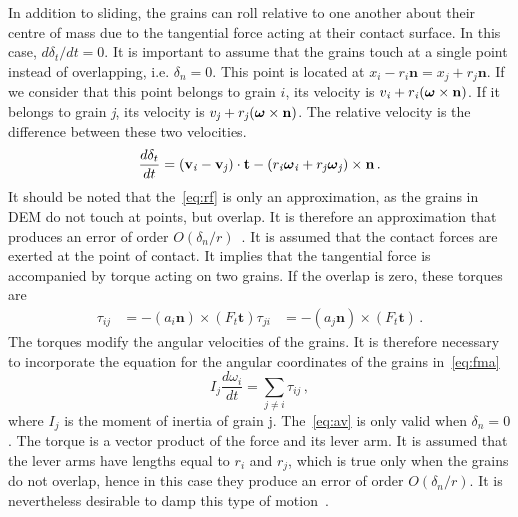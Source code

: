 In addition to sliding, the grains can roll relative to one another about their 
centre of mass due to the tangential force acting at their contact surface. In 
this case, $d\delta_{t}/dt=0$. It is important to assume that the grains touch 
at a single point instead of overlapping, i.e. $\delta_{n}=0$. This point is 
located at 
${x}_{\mathit{i}}-r_{\mathit{i}}\mathbf{n}={x}_{\mathit{j}}+r_{\mathit{j}}\mathbf{n}$.
 If we consider that this point belongs to grain $\mathit{i}$, its velocity is 
${v}_{\mathit{i}}+r_{\mathit{i}}(\mbox{\boldmath${\omega}$}\times\mathbf{n})$. 
If it belongs to grain \textit{j}, its velocity is 
${v}_{\mathit{j}}+r_{\mathit{j}}(\mbox{\boldmath${\omega}$}\times\mathbf{n})$. 
The relative velocity is the difference between these two velocities. 
%
\begin{equation}
\frac{d\delta_{t}}{dt}=(\mathbf{v}_{\mathit{i}}-{\mathbf{v}}_{\mathit{j}})\cdot 
\mathbf{t} 
-(r_{\mathit{i}} \mbox{\boldmath${\omega}$}_{\mathit{i}}
+r_{\mathit{j}}\mbox{\boldmath${\omega}$}_{\mathit{j}})\times\mathbf{n} \,.
\label{eq:rf}
\end{equation}
%
It should be noted that the~\cref{eq:rf} is only an approximation, as the 
grains in DEM do not touch at points, but overlap. It is therefore an 
approximation that produces an error of order 
$\mathbf{\mathit{O}}(\delta_{n}/r)$~\citep{Radjai2011}. It is 
assumed that the contact forces are exerted at the point of contact. It implies 
that the tangential force is accompanied by torque acting on two grains. If the 
overlap is zero, these torques are
%
\begin{align}
\tau_{\mathit{ij}} & = -(a_{\mathit{i}}\mathbf{n})\times(F_{t}\mathbf{t}) 
\tau_{\mathit{ji}} & = -(a_{\mathit{j}}\mathbf{n})\times(F_{t}\mathbf{t}) \,.
\label{eq:av}
\end{align}
%
The torques modify the angular velocities of the grains. It is therefore 
necessary to incorporate the equation for the angular coordinates of the grains 
in~\cref{eq:fma}
%
\begin{equation}
\mathit{I}_{j}\frac{d\omega_{i}}{dt}=\sum\limits_{j\ne i}{\tau_{ij}} \,,
\end{equation}
%
where $\mathit{I}_{j}$ is the moment of inertia of grain j. The~\cref{eq:av} is 
only valid when $\delta_{n}=0$. The torque is a vector product of the force and 
its lever arm. It is assumed that the lever arms have lengths equal to 
$r_{\mathit{i}}$ and $r_{\mathit{j}}$, which is true only when the grains do 
not overlap, hence in this case they produce an error of order 
$\mathbf{\mathit{O}}(\delta_{n}/r)$. It is nevertheless desirable to damp this 
type of motion~\citep{Radjai2011}. 


